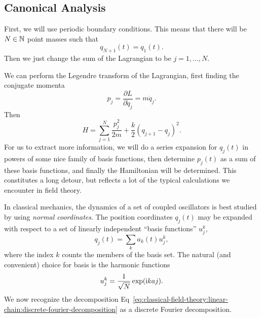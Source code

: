 \subsection{Canonical Analysis}

First, we will use periodic boundary conditions. This means that there
will be $N\in\mathbb{N}$ point masses such that
\begin{equation}
q_{N+1}(t) = q_{1}(t).
\end{equation}
Then we just change the sum of the Lagrangian to be $j=1,\dots,N$.

We can perform the Legendre transform of the Lagrangian, first finding
the conjugate momenta
\begin{equation}\label{eq:classical-field-theory:linear-chain:momentum}
p_{j} = \frac{\partial L}{\partial\dot{q}_{j}} = m\dot{q}_{j}.
\end{equation}
Then
\begin{equation}
H = \sum^{N}_{j=1}\frac{p_{j}^{2}}{2m} + \frac{k}{2}(q_{j+1}-q_{j})^{2}.
\end{equation}
For us to extract more information, we will do a series expansion for
$q_{j}(t)$ in powers of some nice family of basis functions, then
determine $p_{j}(t)$ as a sum of these basis functions, and finally the
Hamiltonian will be determined. This constitutes a long detour, but
reflects a lot of the typical calculations we encounter in field theory. 

In classical mechanics, the dynamics of a set of coupled oscillators is
best studied by using \emph{normal coordinates}. The position
coordinates $q_{j}(t)$ may be expanded with respect to a set of linearly
independent ``basis functions'' $u_{j}^{k}$,
\begin{equation}\label{eq:classical-field-theory:linear-chain:discrete-fourier-decomposition}
q_{j}(t) = \sum_{k}a_{k}(t)u^{k}_{j},
\end{equation}
where the index $k$ counts the members of the basis set. The natural
(and convenient) choice for basis is the harmonic functions
\begin{equation}\label{eq:classical-field-theory:linear-chain:basis-harmonic-functions}
u_{j}^{k} = \frac{1}{\sqrt{N}}\exp(\mathrm{i} kaj).
\end{equation}
We now recognize the decomposition Eq~\eqref{eq:classical-field-theory:linear-chain:discrete-fourier-decomposition}
as a discrete Fourier decomposition.

